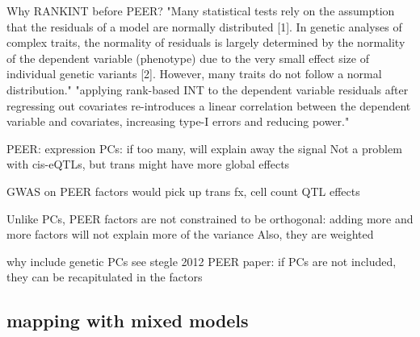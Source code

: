 Why RANKINT before PEER?
"Many statistical tests rely on the assumption that the residuals of a model are normally distributed [1]. In genetic analyses of complex traits, the normality of residuals is largely determined by the normality of the dependent variable (phenotype) due to the very small effect size of individual genetic variants [2]. However, many traits do not follow a normal distribution."
"applying rank-based INT to the dependent variable residuals after regressing out covariates re-introduces a linear correlation between the dependent variable and covariates, increasing type-I errors and reducing power."

PEER:
expression PCs: if too many, will explain away the signal
Not a problem with cis-eQTLs, but trans might have more global effects

    GWAS on PEER factors would pick up trans fx, cell count QTL effects

Unlike PCs, PEER factors are not constrained to be orthogonal: adding more and more factors will not explain more of the variance
    Also, they are weighted

why include genetic PCs
see stegle 2012 PEER paper: if PCs are not included, they can be recapitulated in the factors

\subsection{ mapping with mixed models}


